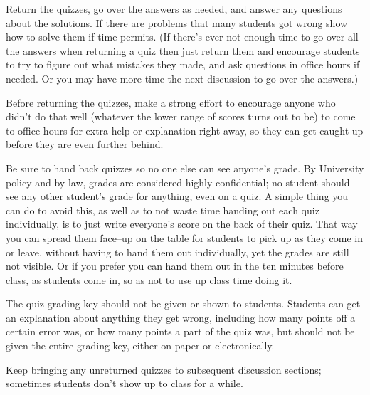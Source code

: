 \documentclass[12pt]{article}
\begin{document}
\begin{itemize*}
\begin{itemize}
              \end{itemize}

              \vspace{-1.5mm}

        \item Return the quizzes, go over the answers as needed, and answer
              any questions about the solutions.  If there are problems that
              many students got wrong show how to solve them if time
              permits.  (If there's ever not enough time to go over all the
              answers when returning a quiz then just return them and
              encourage students to try to figure out what mistakes they
              made, and ask questions in office hours if needed.  Or you may
              have more time the next discussion to go over the answers.)

        \item Before returning the quizzes, make a strong effort to
              encourage anyone who didn't do that well (whatever the lower
              range of scores turns out to be) to come to office hours for
              extra help or explanation right away, so they can get caught
              up before they are even further behind.

        \item Be sure to hand back quizzes so no one else can see anyone's
              grade.  By University policy and by law, grades are considered
              highly confidential; no student should see any other student's
              grade for anything, even on a quiz.  A simple thing you can do
              to avoid this, as well as to not waste time handing out each
              quiz individually, is to just write everyone's score on the
              back of their quiz.  That way you can spread them face--up on
              the table for students to pick up as they come in or leave,
              without having to hand them out individually, yet the grades
              are still not visible.  Or if you prefer you can hand them out
              in the ten minutes before class, as students come in, so as
              not to use up class time doing it.

        \item The quiz grading key should not be given or shown to
              students.  Students can get an explanation about anything they
              get wrong, including how many points off a certain error was,
              or how many points a part of the quiz was, but should not be
              given the entire grading key, either on paper or electronically.

        \item Keep bringing any unreturned quizzes to subsequent discussion
              sections; sometimes students don't show up to class for a while.
  
      \end{itemize*}
  
\end{document}
